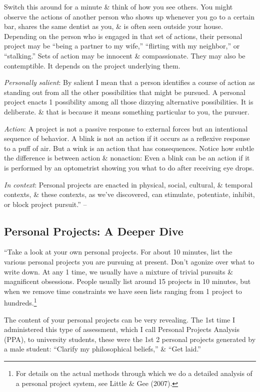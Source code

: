 \documentclass{article}
\numberwithin{equation}{section}
\begin{document}
Switch this around for a minute \& think of how you see others. You might observe the actions of another person who shows up whenever you go to a certain bar, shares the same dentist as you, \& is often seen outside your house. Depending on the person who is engaged in that set of actions, their personal project may be ``being a partner to my wife,'' ``flirting with my neighbor,'' or ``stalking.'' Sets of action may be innocent \& compassionate. They may also be contemptible. It depends on the project underlying them.

\textit{Personally salient}: By salient I mean that a person identifies a course of action as standing out from all the other possibilities that might be pursued. A personal project enacts 1 possibility among all those dizzying alternative possibilities. It is deliberate. \& that is because it means something particular to you, the pursuer.

\textit{Action}: A project is not a passive response to external forces but an intentional sequence of behavior. A blink is not an action if it occurs as a reflexive response to a puff of air. But a wink is an action that has consequences. Notice how subtle the difference is between action \& nonaction: Even a blink can be an action if it is performed by an optometrist showing you what to do after receiving eye drops.

\textit{In context}: Personal projects are enacted in physical, social, cultural, \& temporal contexts, \& these contexts, as we've discovered, can stimulate, potentiate, inhibit, or block project pursuit.'' -- \cite[pp. 27--31]{Little2017}

\subsection{Personal Projects: A Deeper Dive}
``Take a look at your own personal projects. For about 10 minutes, list the various personal projects you are pursuing at present. Don't agonize over what to write down. At any 1 time, we usually have a mixture of trivial pursuits \& magnificent obsessions. People usually list around 15 projects in 10 minutes, but when we remove time constraints we have seen lists ranging from 1 project to hundreds.\footnote{For details on the actual methods through which we do a detailed analysis of a personal project system, see Little \& Gee (2007).}

The content of your personal projects can be very revealing. The 1st time I administered this type of assessment, which I call Personal Projects Analysis (PPA), to university students, these were the 1st 2 personal projects generated by a male student: ``Clarify my philosophical beliefs,'' \& ``Get laid.''
\end{document}
